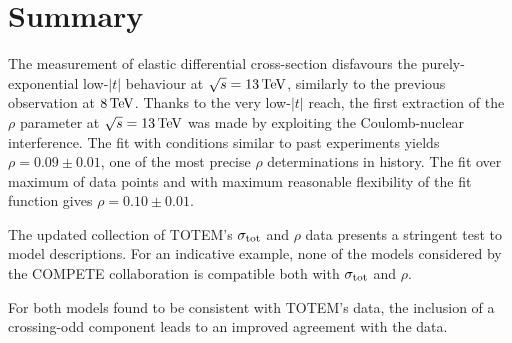 \section{Summary}
\label{sec:summary}

The measurement of elastic differential cross-section disfavours the purely-exponential low-$|t|$ behaviour at $\sqrt s = 13\,{\rm TeV}$, similarly to the previous observation at $8\,{\rm TeV}$. Thanks to the very low-$|t|$ reach, the first extraction of the $\rho$ parameter at $\sqrt s = 13\,{\rm TeV}$ was made by exploiting the Coulomb-nuclear interference. The fit with conditions similar to past experiments yields $\rho = 0.09 \pm 0.01$, one of the most precise $\rho$ determinations in history. The fit over maximum of data points and with maximum reasonable flexibility of the fit function gives $\rho = 0.10 \pm 0.01$.

The updated collection of TOTEM's $\sigma_{\rm tot}$ and $\rho$ data presents a stringent test to model descriptions. For an indicative example, none of the models considered by the COMPETE collaboration is compatible both with $\sigma_{\rm tot}$ and $\rho$.

For both models found to be consistent with TOTEM's data, the inclusion of a crossing-odd component leads to an improved agreement with the data.
